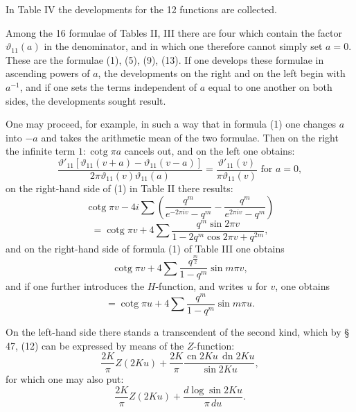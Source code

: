 In Table IV the developments for the 12 functions are collected.

Among the 16 formulae of Tables II, III there are four which contain the factor $\vartheta_{11}(a)$ in the denominator, and in which one therefore cannot simply set $a=0$. These are the formulae (1), (5), (9), (13). If one develops these formulae in ascending powers of $a$, the developments on the right and on the left begin with $a^{-1}$, and if one sets the terms independent of $a$ equal to one another on both sides, the developments sought result.

One may proceed, for example, in such a way that in formula (1) one changes $a$ into $-a$ and takes the arithmetic mean of the two formulae. Then on the right the infinite term $1:\operatorname{cotg}\pi a$ cancels out, and on the left one obtains:
\[
\frac{\vartheta'_{11}[\vartheta_{11}(v+a)-\vartheta_{11}(v-a)]}{2\pi\vartheta_{11}(v)\vartheta_{11}(a)} = \frac{\vartheta'_{11}(v)}{\pi\vartheta_{11}(v)} \text{ for } a=0,
\]
on the right-hand side of (1) in Table II there results:
\[
\operatorname{cotg}\pi v - 4i\sum\left(\frac{q^m}{e^{-2\pi iv}-q^m} - \frac{q^m}{e^{2\pi iv}-q^m}\right)
\]
\[
= \operatorname{cotg}\pi v + 4\sum\frac{q^m\sin 2\pi v}{1-2q^m\cos 2\pi v+q^{2m}},
\]
and on the right-hand side of formula (1) of Table III one obtains
\[
\operatorname{cotg}\pi v + 4\sum\frac{q^{\frac{m}{2}}}{1-q^m}\sin m\pi v,
\]
and if one further introduces the  $H$-function, and writes $u$ for $v$, one obtains
\[
= \operatorname{cotg}\pi u + 4\sum\frac{q^m}{1-q^m}\sin m\pi u.
\]

On the left-hand side there stands a transcendent of the second kind, which by \S\,47, (12) can be expressed by means of the $Z$-function:
\[
\frac{2K}{\pi}Z(2Ku) + \frac{2K}{\pi}\frac{\operatorname{cn}2Ku\,\operatorname{dn}2Ku}{\operatorname{sin}2Ku},
\]
for which one may also put:
\[
\frac{2K}{\pi}Z(2Ku) + \frac{d\log\operatorname{sin}2Ku}{\pi\,du}.
\]
